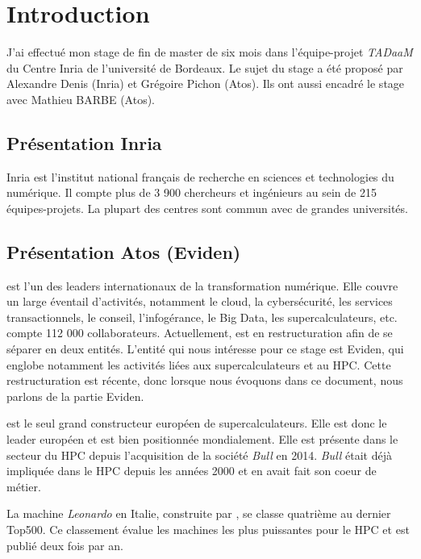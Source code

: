 \section{Introduction}

J'ai effectué mon stage de fin de master de six mois dans l'équipe-projet \emph{TADaaM} du Centre Inria de l'université de Bordeaux.
Le sujet du stage a été proposé par Alexandre Denis (Inria) et Grégoire Pichon (Atos).
Ils ont aussi encadré le stage avec Mathieu BARBE (Atos).

\subsection{Présentation Inria}

Inria est l'institut national français de recherche en sciences et technologies du numérique.
Il compte plus de 3 900 chercheurs et ingénieurs au sein de 215 équipes-projets.
La plupart des centres sont commun avec de grandes universités.


\subsection{Présentation Atos (Eviden)}

\atos{} est l'un des leaders internationaux de la transformation numérique.
Elle couvre un large éventail d'activités, notamment le cloud, la cybersécurité, les services transactionnels, le conseil, l'infogérance, le Big Data, les supercalculateurs, etc.
\atos{} compte 112 000 collaborateurs.
Actuellement, \atos{} est en restructuration afin de se séparer en deux entités.
L'entité qui nous intéresse pour ce stage est Eviden, qui englobe notamment les activités liées aux supercalculateurs et au HPC.
Cette restructuration est récente, donc lorsque nous évoquons \atos{} dans ce document, nous parlons de la partie Eviden.

\atos{} est le seul grand constructeur européen de supercalculateurs.
Elle est donc le leader européen et est bien positionnée mondialement.
Elle est présente dans le secteur du HPC depuis l'acquisition de la société \emph{Bull} en 2014.
\emph{Bull} était déjà impliquée dans le HPC depuis les années 2000 et en avait fait son coeur de métier.

La machine \emph{Leonardo} en Italie, construite par \atos{}, se classe quatrième au dernier Top500.
Ce classement évalue les machines les plus puissantes pour le HPC et est publié deux fois par an.

